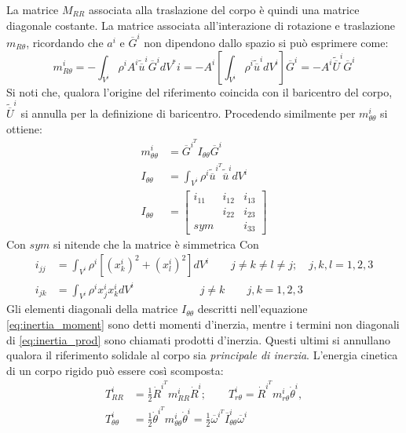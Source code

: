La matrice $M_{RR}$ associata alla traslazione del corpo è quindi una matrice diagonale costante.
La matrice associata all'interazione di rotazione e traslazione $m_{R\theta}$, ricordando che $a^i$ e $\overline{G}^i$ non dipendono dallo spazio si può esprimere come:
\begin{equation}
m^i_{R\theta} = - \int_{V^i}\rho^iA^i\tilde{\overline{u}}^i\overline{G}^idV^*i = -A^i \left[ \int_{V^i}\rho^i\tilde{\overline{u}}^i dV^i \right]  \overline{G}^i = -A^i\tilde{\overline{U}}^i\overline{G}^i
\end{equation}
Si noti che, qualora l'origine del riferimento coincida con il baricentro del corpo, $\tilde{\overline{U}}^i$ si annulla per la definizione di baricentro. 
Procedendo similmente per $m^i_{\theta\theta}$ si ottiene: \begin{align}
m^i_{\theta\theta} &= \overline{G}^{i^T}I_{\theta\theta}\overline{G}^i \\
I_{\theta\theta} &= \int_{V^i} \rho^i\tilde{\overline{u}}^{i^T} \tilde{\overline{u}}^i dV^i \\
I_{\theta\theta}&= \begin{bmatrix}i_{11} & i_{12} & i_{13} \\ \quad & i_{22} & i_{23} \\ sym & \quad & i_{33}\end{bmatrix}
\end{align}
Con $sym$ si nitende che la matrice è simmetrica
Con \begin{align} \label{eq:inertia_moment}
i_{jj} &= \int_{V^i} \rho^i[(x_k^i)^2+(x_l^i)^2]dV^i \qquad j\neq k\neq l\neq j ; \quad j,k,l = 1,2,3 \\
\label{eq:inertia_prod} i_{jk} &= \int_{V^i} \rho^ix_j^ix_k^i dV^i \qquad \qquad\qquad j\neq k \qquad j,k = 1,2,3
\end{align}
Gli elementi diagonali della matrice $I_{\theta\theta}$ descritti nell'equazione \ref{eq:inertia_moment} sono detti momenti d'inerzia, mentre i termini non diagonali di \ref{eq:inertia_prod} sono chiamati prodotti d'inerzia. Questi ultimi si annullano qualora il riferimento solidale al corpo sia \emph{principale di inerzia}.
L'energia cinetica di un corpo rigido può essere così scomposta:
\begin{align} \nonumber
T^i_{RR} &= \frac{1}{2}\dot{R}^{i^T}m^i_{RR}\dot{R}^i; \qquad T^i_{r\theta} = \dot{R}^{i^T}m^i_{r\theta}\dot{\theta}^i, \\ \nonumber
T^i_{\theta\theta} &= \frac{1}{2}\dot{\theta}^{i^T}m^i_{\theta\theta}\dot{\theta}^i =  \frac{1}{2} \overline{\omega}^{i^T}\overline{I}^i_{\theta\theta}\overline{\omega}^i
\end{align}
